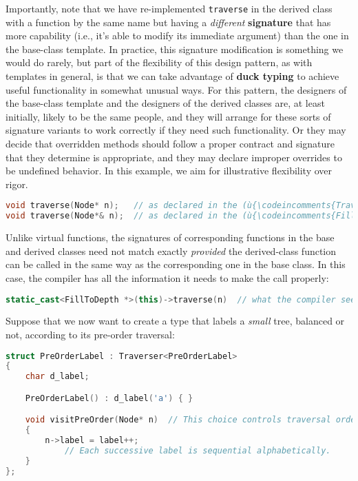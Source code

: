 Importantly, note that we have re-implemented \texttt{traverse} in the
derived class with a function by the same name but having a
\emph{different} \textbf{signature} that has more capability (i.e., it's able
to modify its immediate argument) than the one in the base-class
template. In practice, this signature modification is something we would
do rarely, but part of the flexibility of this design pattern, as with
templates in general, is that we can take advantage of \textbf{duck
typing} to achieve useful functionality in somewhat unusual ways. For
this pattern, the designers of the base-class template and the designers
of the derived classes are, at least initially, likely to be the same
people, and they will arrange for these sorts of signature variants to
work correctly if they need such functionality. Or they may decide that
overridden methods should follow a proper contract and signature that
they determine is appropriate, and they may declare improper overrides
to be undefined behavior. In this example, we aim for illustrative
flexibility over rigor.

\begin{lstlisting}[language=C++]
void traverse(Node* n);   // as declared in the (ù{\codeincomments{Traverser}}ù) base-class template
void traverse(Node*& n);  // as declared in the (ù{\codeincomments{FillToDepth}}ù) derived class
\end{lstlisting}
    
\noindent Unlike virtual functions, the signatures of corresponding functions in
the base and derived classes need not match exactly \emph{provided} the
derived-class function can be called in the same way as the
corresponding one in the base class. In this case, the compiler has all
the information it needs to make the call properly:

\begin{lstlisting}[language=C++]
static_cast<FillToDepth *>(this)->traverse(n)  // what the compiler sees
\end{lstlisting}
    
\noindent Suppose that we now want to create a type that labels a \emph{small}
tree, balanced or not, according to its pre-order traversal:

\begin{lstlisting}[language=C++]
struct PreOrderLabel : Traverser<PreOrderLabel>
{
    char d_label;

    PreOrderLabel() : d_label('a') { }

    void visitPreOrder(Node* n)  // This choice controls traversal order.
    {
        n->label = label++;   
            // Each successive label is sequential alphabetically.
    }
};
\end{lstlisting}
    
